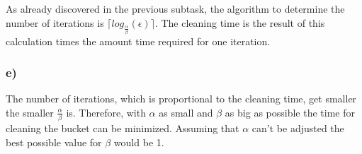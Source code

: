 As already discovered in the previous subtask, the algorithm to determine the number of iterations is $\lceil log_{\frac{\alpha}{\beta}}(\epsilon) \rceil$. The cleaning time is the result of this calculation times the amount time required for one iteration.

\subsubsection{e)}

The number of iterations, which is proportional to the cleaning time, get smaller the smaller $\frac{\alpha}{\beta}$ is. Therefore, with $\alpha$ as small and $\beta$ as big as possible the time for cleaning the bucket can be minimized. Assuming that $\alpha$ can't be adjusted the best possible value for $\beta$ would be 1.

